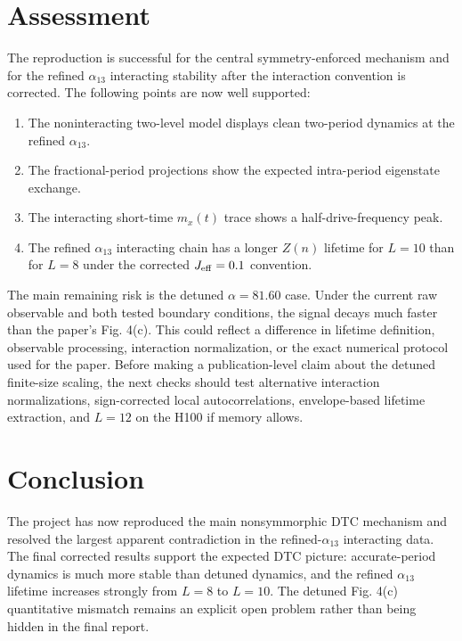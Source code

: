 \documentclass[aps,pra,preprint,superscriptaddress,nofootinbib]{revtex4-2}
\begin{document}
\section{Assessment}

The reproduction is successful for the central symmetry-enforced mechanism and for the refined \(\alpha_{13}\) interacting stability after the interaction convention is corrected. The following points are now well supported:
\begin{enumerate}
\item The noninteracting two-level model displays clean two-period dynamics at the refined \(\alpha_{13}\).
\item The fractional-period projections show the expected intra-period eigenstate exchange.
\item The interacting short-time \(m_x(t)\) trace shows a half-drive-frequency peak.
\item The refined \(\alpha_{13}\) interacting chain has a longer \(Z(n)\) lifetime for \(L=10\) than for \(L=8\) under the corrected \(J_{\rm eff}=0.1\) convention.
\end{enumerate}

The main remaining risk is the detuned \(\alpha=81.60\) case. Under the current raw observable and both tested boundary conditions, the signal decays much faster than the paper's Fig. 4(c). This could reflect a difference in lifetime definition, observable processing, interaction normalization, or the exact numerical protocol used for the paper. Before making a publication-level claim about the detuned finite-size scaling, the next checks should test alternative interaction normalizations, sign-corrected local autocorrelations, envelope-based lifetime extraction, and \(L=12\) on the H100 if memory allows.

\section{Conclusion}

The project has now reproduced the main nonsymmorphic DTC mechanism and resolved the largest apparent contradiction in the refined-\(\alpha_{13}\) interacting data. The final corrected results support the expected DTC picture: accurate-period dynamics is much more stable than detuned dynamics, and the refined \(\alpha_{13}\) lifetime increases strongly from \(L=8\) to \(L=10\). The detuned Fig. 4(c) quantitative mismatch remains an explicit open problem rather than being hidden in the final report.
\end{document}
